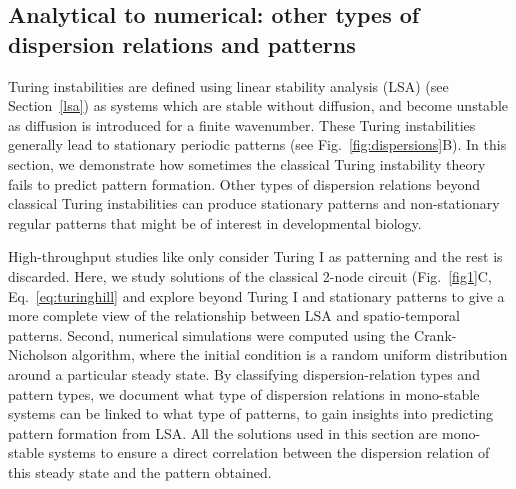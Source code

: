 \subsection{Analytical to numerical: other types of dispersion relations and patterns} \label{nogrowth}

Turing instabilities are defined using linear stability analysis (LSA) (see Section~\ref{lsa}) as systems which are stable without diffusion, and become unstable as diffusion is introduced for a finite wavenumber. These Turing instabilities generally lead to stationary periodic patterns (see Fig.~\ref{fig:dispersions}B). In this section, we demonstrate how sometimes the classical Turing instability theory fails to predict pattern formation.
Other types of dispersion relations beyond classical Turing instabilities can produce stationary patterns and non-stationary regular patterns that might be of interest in developmental biology.

High-throughput studies like \cite{Scholes2019, Zheng2016, Marcon} only consider Turing I as patterning and the rest is discarded.
Here, we study solutions of the classical 2-node circuit (Fig.~\ref{fig1}C, Eq.~\ref{eq:turinghill} and explore beyond Turing I and stationary patterns to give a more complete view of the relationship between LSA and spatio-temporal patterns.
Second, numerical simulations were computed using the Crank-Nicholson algorithm, where the initial condition is a random uniform distribution around a particular steady state.
By classifying dispersion-relation types and pattern types, we document what type of dispersion relations in mono-stable systems can be linked to what type of patterns, to gain insights into predicting pattern formation from LSA. All the solutions used in this section are mono-stable systems to ensure a direct correlation between the dispersion relation of this steady state and the pattern obtained.

